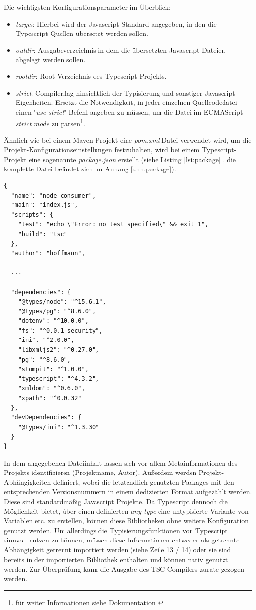 Die wichtigsten Konfigurationsparameter im Überblick:

\begin{itemize}
  \item \emph{target}: Hierbei wird der Javascript-Standard angegeben, in den die Typescript-Quellen übersetzt werden sollen.
  \item \emph{outdir}: Ausgabeverzeichnis in dem die übersetzten Javascript-Dateien abgelegt werden sollen.
  \item \emph{rootdir}: Root-Verzeichnis des Typescript-Projekts.
  \item \emph{strict}: Compilerflag hinsichtlich der Typisierung und sonstiger Javascript-Eigenheiten. Ersetzt die Notwendigkeit, in jeder einzelnen Quellcodedatei einen "\emph{use strict}" Befehl angeben zu müssen, um die Datei im ECMAScript \emph{strict mode} zu parsen\footnote{für weiter Informationen siehe Dokumentation \cite[Kapitel~tsconfig]{typescript-doc}}.
\end{itemize}

Ähnlich wie bei einem Maven-Projekt eine \emph{pom.xml} Datei verwendet wird, um die Projekt-Konfigurationseinstellungen festzuhalten, wird bei einem Typescript-Projekt eine sogenannte \emph{package.json} erstellt (siehe Listing \ref{lst:package} , die komplette Datei befindet sich im Anhang \ref{anh:package}).


\begin{minipage}{\linewidth}
\begin{lstlisting}[style=javaStyle,caption={Typescript -- package.json},label=lst:package]
  {
  "name": "node-consumer",
  "main": "index.js",
  "scripts": {
    "test": "echo \"Error: no test specified\" && exit 1",
    "build": "tsc"
  },
  "author": "hoffmann",

  ...

  "dependencies": {
    "@types/node": "^15.6.1",
    "@types/pg": "^8.6.0",
    "dotenv": "^10.0.0",
    "fs": "^0.0.1-security",
    "ini": "^2.0.0",
    "libxmljs2": "^0.27.0",
    "pg": "^8.6.0",
    "stompit": "^1.0.0",
    "typescript": "^4.3.2",
    "xmldom": "^0.6.0",
    "xpath": "^0.0.32"
  },
  "devDependencies": {
    "@types/ini": "^1.3.30"
  }
}
\end{lstlisting}
\end{minipage}

In dem angegebenen Dateiinhalt lassen sich vor allem Metainformationen des Projekts identifizieren (Projektname, Autor). Außerdem werden Projekt-Abhängigkeiten definiert, wobei die letztendlich genutzten Packages mit den entsprechenden Versionsnummern in einem dedizierten Format aufgezählt werden. Diese sind standardmäßig Javascript Projekte. Da Typescript dennoch die Möglichkeit bietet, über einen definierten \emph{any type} eine untypisierte Variante von Variablen etc. zu erstellen, können diese Bibliotheken ohne weitere Konfiguration genutzt werden. Um allerdings die Typisierungsfunktionen von Typescript sinnvoll nutzen zu können, müssen diese Informationen entweder als getrennte Abhängigkeit getrennt importiert werden (siehe Zeile 13 / 14) oder sie sind bereits in der importierten Bibliothek enthalten und können nativ genutzt werden. Zur Überprüfung kann die Ausgabe des TSC-Compilers zurate gezogen werden.

